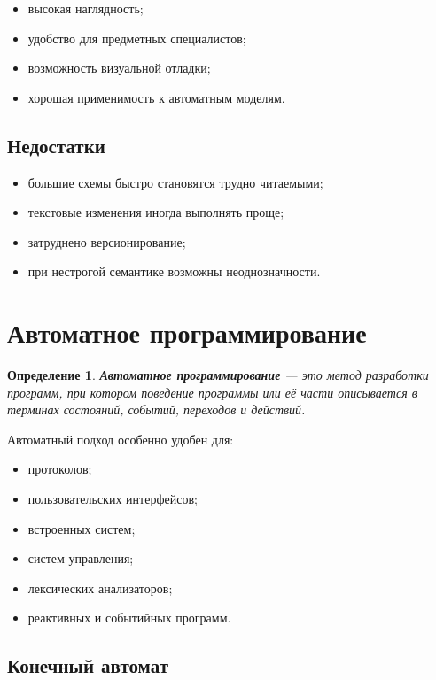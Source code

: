 \documentclass[12pt,a4paper]{article}
\newtheorem{definition}{Определение}
\begin{document}
\begin{itemize}
    \item высокая наглядность;
    \item удобство для предметных специалистов;
    \item возможность визуальной отладки;
    \item хорошая применимость к автоматным моделям.
\end{itemize}

\subsection{Недостатки}

\begin{itemize}
    \item большие схемы быстро становятся трудно читаемыми;
    \item текстовые изменения иногда выполнять проще;
    \item затруднено версионирование;
    \item при нестрогой семантике возможны неоднозначности.
\end{itemize}

\section{Автоматное программирование}

\begin{definition}
\textbf{Автоматное программирование} --- это метод разработки программ, при котором поведение программы или её части описывается в терминах состояний, событий, переходов и действий.
\end{definition}

Автоматный подход особенно удобен для:
\begin{itemize}
    \item протоколов;
    \item пользовательских интерфейсов;
    \item встроенных систем;
    \item систем управления;
    \item лексических анализаторов;
    \item реактивных и событийных программ.
\end{itemize}

\subsection{Конечный автомат}
\end{document}
